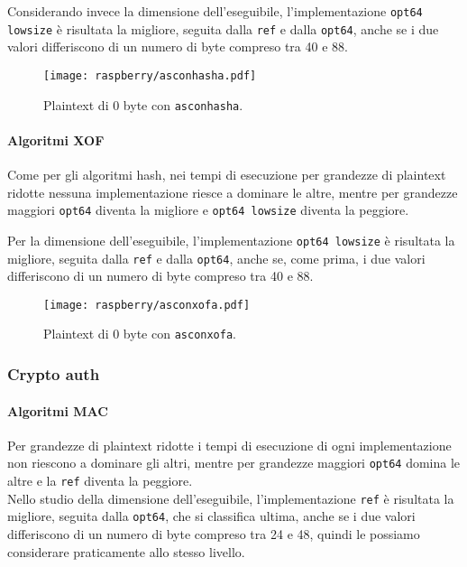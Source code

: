 \noindent Considerando invece la dimensione dell'eseguibile, l'implementazione \texttt{opt64 lowsize} è risultata la migliore, seguita dalla \texttt{ref} e dalla \texttt{opt64}, anche se i due valori differiscono di un numero di byte compreso tra 40 e 88.

\begin{figure}[H]
    \centering
    \texttt{[image: raspberry/asconhasha.pdf]}
    \caption{Plaintext di 0 byte con \texttt{asconhasha}.}
\end{figure}

\paragraph{Algoritmi XOF}

Come per gli algoritmi hash, nei tempi di esecuzione per grandezze di plaintext ridotte nessuna implementazione riesce a dominare le altre, mentre per grandezze maggiori \texttt{opt64} diventa la migliore e \texttt{opt64 lowsize} diventa la peggiore.

\noindent Per la dimensione dell'eseguibile, l'implementazione \texttt{opt64 lowsize} è risultata la migliore, seguita dalla \texttt{ref} e dalla \texttt{opt64}, anche se, come prima, i due valori differiscono di un numero di byte compreso tra 40 e 88.

\begin{figure}[H]
    \centering
    \texttt{[image: raspberry/asconxofa.pdf]}
    \caption{Plaintext di 0 byte con \texttt{asconxofa}.}
\end{figure}

\subsubsection{Crypto auth}

\paragraph{Algoritmi MAC}

Per grandezze di plaintext ridotte i tempi di esecuzione di ogni implementazione non riescono a dominare gli altri, mentre per grandezze maggiori \texttt{opt64} domina le altre e la \texttt{ref} diventa la peggiore. \\

\noindent Nello studio della dimensione dell'eseguibile, l'implementazione \texttt{ref} è risultata la migliore, seguita dalla \texttt{opt64}, che si classifica ultima, anche se i due valori differiscono di un numero di byte compreso tra 24 e 48, quindi le possiamo considerare praticamente allo stesso livello.

